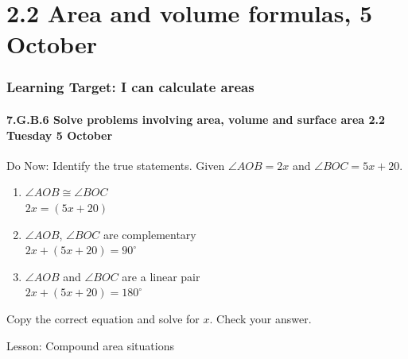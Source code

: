 \documentclass{beamer}
\begin{document}
\section{2.2 Area and volume formulas, 5 October}
\frame
{
  \frametitle{Learning Target: I can calculate areas}
  \framesubtitle{7.G.B.6 Solve problems involving area, volume and surface area \hfill \alert{2.2 Tuesday 5 October}}
  \begin{block}{Do Now: Identify the true statements.}
    Given $\angle AOB = 2x$ and $\angle BOC = 5x+20$.
    \begin{multicols}{2}
       \begin{enumerate}
         \item $\angle AOB \cong \angle BOC$\\
         $2x = (5x+20)$
         \item $\angle AOB$, $\angle BOC$ are complementary\\
         $2x + (5x+20)=90^\circ$
         \item $\angle AOB$ and $\angle BOC$ are a linear pair\\
         $2x + (5x+20)=180^\circ$
     \end{enumerate}
     \begin{center}
     \end{center}
   \end{multicols}
   Copy the correct equation and solve for $x$. Check your answer.
\end{block}
  Lesson: Compound area situations
}
\end{document}
